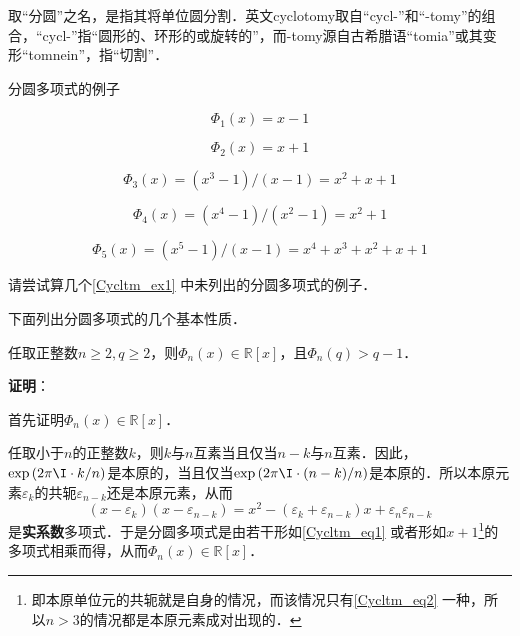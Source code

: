 取“分圆”之名，是指其将单位圆分割．英文cyclotomy取自“cycl-”和“-tomy”的组合，“cycl-”指“圆形的、环形的或旋转的”，而-tomy源自古希腊语“tomia”或其变形“tomnein”，指“切割”．




\begin{example}{分圆多项式的例子}\label{Cycltm_ex1}

\begin{equation}
\Phi_1(x) = x-1
\end{equation}

\begin{equation}\label{Cycltm_eq2}
\Phi_2(x) = x+1
\end{equation}

\begin{equation}
\Phi_3(x) = (x^3-1)/(x-1) = x^2+x+1
\end{equation}

\begin{equation}
\Phi_4(x) = (x^4-1)/(x^2-1) = x^2+1
\end{equation}

\begin{equation}
\Phi_5(x) = (x^5-1)/(x-1) = x^4+x^3+x^2+x+1
\end{equation}


\end{example}

\begin{exercise}{}
请尝试算几个\autoref{Cycltm_ex1} 中未列出的分圆多项式的例子．
\end{exercise}

下面列出分圆多项式的几个基本性质．

\begin{theorem}{}
任取正整数$n\geq 2, q\geq 2$，则$\Phi_n(x)\in\mathbb{R}[x]$，且$\Phi_n(q)>q-1$．
\end{theorem}

\textbf{证明}：

首先证明$\Phi_n(x)\in\mathbb{R}[x]$．

任取小于$n$的正整数$k$，则$k$与$n$互素当且仅当$n-k$与$n$互素．因此，$\exp{(2\pi\I\cdot  k/n)}$是本原的，当且仅当$\exp{(2\pi\I\cdot  (n-k)/n)}$是本原的．所以本原元素$\varepsilon_k$的共轭$\varepsilon_{n-k}$还是本原元素，从而
\begin{equation}\label{Cycltm_eq1}
(x-\varepsilon_k)(x-\varepsilon_{n-k})=x^2-(\varepsilon_k+\varepsilon_{n-k})x+\varepsilon_n\varepsilon_{n-k}
\end{equation}
是\textbf{实系数}多项式．于是分圆多项式是由若干形如\autoref{Cycltm_eq1} 或者形如$x+1$\footnote{即本原单位元的共轭就是自身的情况，而该情况只有\autoref{Cycltm_eq2} 一种，所以$n>3$的情况都是本原元素成对出现的．}的多项式相乘而得，从而$\Phi_n(x)\in\mathbb{R}[x]$．

